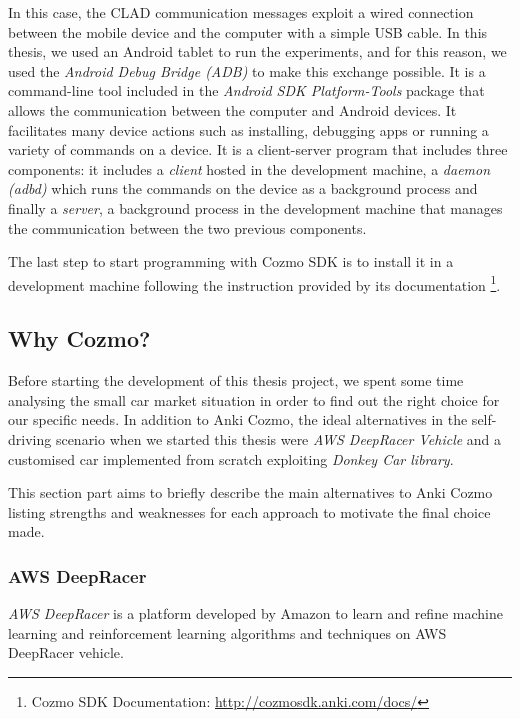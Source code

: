 In this case, the CLAD communication messages exploit a wired connection between the mobile device and the computer with a simple USB cable. In this thesis, we used an Android tablet to run the experiments, and for this reason, we used the \textit{Android Debug Bridge (ADB)} to make this exchange possible.
It is a command-line tool included in the \textit{Android SDK Platform-Tools} package that allows the communication between the computer and Android devices. It facilitates many device actions such as installing, debugging apps or running a variety of commands on a device. It is a client-server program that includes three components: it includes a \textit{client} hosted in the development machine, a \textit{daemon (adbd)} which runs the commands on the device as a background process and finally a \textit{server}, a background process in the development machine that manages the communication between the two previous components.

The last step to start programming with Cozmo SDK is to install it in a development machine following the instruction provided by its documentation \footnote{Cozmo SDK Documentation: \href{http://cozmosdk.anki.com/docs/index.html}{http://cozmosdk.anki.com/docs/}}.


\subsection{Why Cozmo?}

Before starting the development of this thesis project, we spent some time analysing the small car market situation in order to find out the right choice for our specific needs. In addition to Anki Cozmo, the ideal alternatives in the self-driving scenario when we started this thesis were \textit{AWS DeepRacer Vehicle} and a customised car implemented from scratch exploiting \textit{Donkey \textregistered
	Car library}.

This section part aims to briefly describe the main alternatives to Anki Cozmo listing strengths and weaknesses for each approach to motivate the final choice made.

\subsubsection{AWS DeepRacer}

\textit{AWS DeepRacer} is a platform developed by Amazon to learn and refine machine learning and reinforcement learning algorithms and techniques on AWS DeepRacer vehicle.

